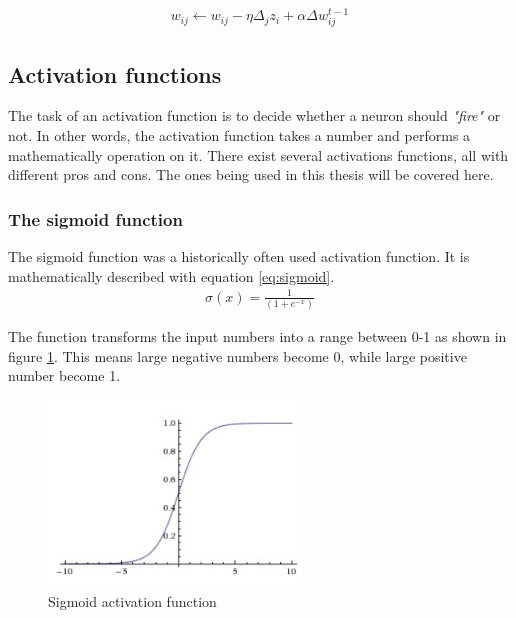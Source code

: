 \documentclass[USenglish]{ifimaster}  %
\begin{document}
\begin{equation}\label{eq:momentum}
\begin{aligned}
w_{ij} \longleftarrow w_{ij} - \eta\Delta_j z_i+\alpha\Delta w^{t-1}_{ij}
\end{aligned}
\end{equation}

\subsection{Activation functions}
The task of an activation function is to decide whether a neuron should \textit{"fire"} or not. In other words, the activation function takes a number and performs a mathematically operation on it. There exist several activations functions, all with different pros and cons. The ones being used in this thesis will be covered here.
\subsubsection{The sigmoid function}
The sigmoid function was a historically often used activation function. It is mathematically described with equation \ref{eq:sigmoid}.
\begin{equation}\label{eq:sigmoid}
\begin{aligned}
\sigma(x) = \frac{1}{(1 + e^{-x})}
\end{aligned}
\end{equation}

The function transforms the input numbers into a range between 0-1 as shown in figure \ref{fig:sigmoid}. This means large negative numbers become 0, while large positive number become 1.

\begin{figure}[ht]
    \centering
    \includegraphics[width=0.6\textwidth]{bilder/sigmoid_function.png}
    \caption{Sigmoid activation function \cite{website:cs231n_activation_functions}}
    \label{fig:sigmoid}
\end{figure}
\end{document}
